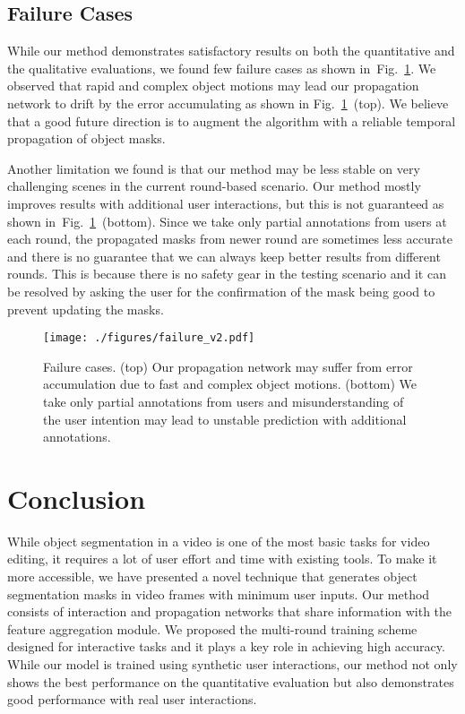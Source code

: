 \documentclass[10pt,twocolumn,letterpaper]{article}
\newcommand{\fref}[1]{Fig.~\ref{#1}}
\begin{document}
\subsection{Failure Cases}
While our method demonstrates satisfactory results on both the quantitative and the qualitative evaluations, we found few failure cases as shown in~\fref{Fig:failure}. We observed that rapid and complex object motions may lead our propagation network to drift by the error accumulating as shown in \fref{Fig:failure}~(top). We believe that a good future direction is to augment the algorithm with a reliable temporal propagation of object masks.

Another limitation we found is that our method may be less stable on very challenging scenes in the current round-based scenario. Our method mostly improves results with additional user interactions, but this is not guaranteed as shown in~\fref{Fig:failure}~(bottom).
Since we take only partial annotations from users at each round, the propagated masks from newer round are sometimes less accurate and there is no guarantee that we can always keep better results from different rounds.
This is because there is no safety gear in the testing scenario and it can be resolved by asking the user for the confirmation of the mask being good to prevent updating the masks. 



\begin{figure}
\centering
\texttt{[image: ./figures/failure\_v2.pdf]}
\caption{Failure cases. (top) Our propagation network may suffer from error accumulation due to fast and complex object motions. (bottom) We take only partial annotations from users and misunderstanding of the user intention may lead to unstable prediction with additional annotations.}
\vspace{-5pt}
\label{Fig:failure}
\end{figure}


\section{Conclusion}
While object segmentation in a video is one of the most basic tasks for video editing, it requires a lot of user effort and time with existing tools. To make it more accessible, we have presented a novel technique that generates object segmentation masks in video frames with minimum user inputs. Our method consists of interaction and propagation networks that share information with the feature aggregation module. We proposed the multi-round training scheme designed for interactive tasks and it plays a key role in achieving high accuracy. While our model is trained using synthetic user interactions, our method not only shows the best performance on the quantitative evaluation but also demonstrates good performance with real user interactions. 
\end{document}

